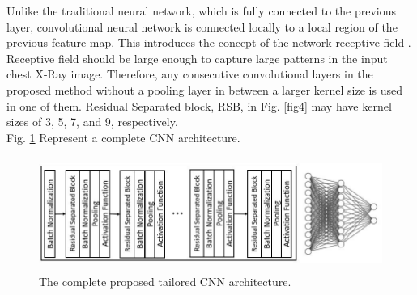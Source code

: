 Unlike the traditional neural network, which is fully connected to the previous layer, convolutional neural network is connected locally to a local region of the previous feature map. This introduces the concept of the network receptive field \cite{receptivefield}. Receptive field should be large enough to capture large patterns in the input chest X-Ray image. Therefore, any consecutive convolutional layers in the proposed method without a pooling layer in between a larger kernel size is used in one of them. Residual Separated block, RSB, in Fig. \ref{fig4} may have kernel sizes of 3, 5, 7, and 9, respectively.\\
Fig. \ref{fig5} Represent a complete CNN architecture.



\begin{figure}
\begin{center}
\includegraphics[height=37mm,width=14.0cm]{Figures/fig5.jpg}
\caption{The complete proposed tailored CNN architecture.}
\end{center}
\label{fig5}
\end{figure}